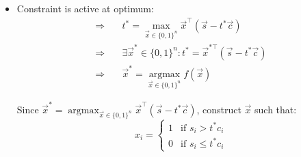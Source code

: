 \begin{solution}
\begin{itemize}
              Which contradicts the fact that $t^* = \max_{\vec{x} \in \{0,1\}^n} f(\vec{x})$.

        \item[(d)] Constraint is active at optimum:
              \begin{align*}
                  \Rightarrow \quad & t^* = \max_{\vec{x} \in \{0,1\}^n}
                  \vec{x}^\top(\vec{s} - t^*\vec{c})                                             \\
                  \Rightarrow \quad & \exists \vec{x}^* \in \{0,1\}^n :
                  t^* = \vec{x}^{*\top}(\vec{s} - t^*\vec{c})                                    \\
                  \Rightarrow \quad & \vec{x}^* = \operatorname*{argmax}_{\vec{x} \in \{0,1\}^n}
                  f(\vec{x})
              \end{align*}

              Since $\vec{x}^* = \operatorname*{argmax}_{\vec{x} \in \{0,1\}^n}
                  \vec{x}^\top(\vec{s} - t^*\vec{c})$, construct $\vec{x}$ such that:
              \begin{equation*}
                  x_i = \begin{cases}
                      1 & \text{if } s_i > t^*c_i   \\
                      0 & \text{if } s_i \le t^*c_i
                  \end{cases}
              \end{equation*}

    \end{itemize}
\end{solution}